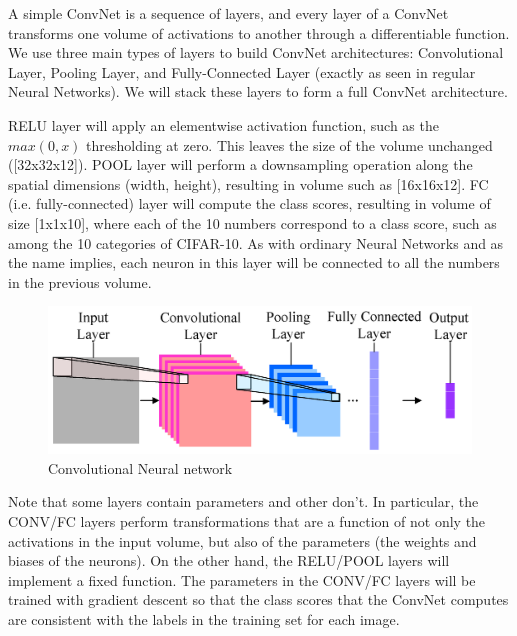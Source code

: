 A simple ConvNet is a sequence of layers, and every layer of a ConvNet transforms one volume of activations to another through a differentiable function. We use three main types of layers to build ConvNet architectures: Convolutional Layer, Pooling Layer, and Fully-Connected Layer (exactly as seen in regular Neural Networks). We will stack these layers to form a full ConvNet architecture.


RELU layer will apply an elementwise activation function, such as the $max(0,x)$ thresholding at zero. This leaves the size of the volume unchanged ([32x32x12]).
POOL layer will perform a downsampling operation along the spatial dimensions (width, height), resulting in volume such as [16x16x12].
FC (i.e. fully-connected) layer will compute the class scores, resulting in volume of size [1x1x10], where each of the 10 numbers correspond to a class score, such as among the 10 categories of CIFAR-10. As with ordinary Neural Networks and as the name implies, each neuron in this layer will be connected to all the numbers in the previous volume.
\begin{figure}[htb!]
    \centering
    \includegraphics[scale=1.25]{chapters/litReview/files/convNet.png}
    \caption{Convolutional Neural network \cite{convNN}}
    \label{Neural network}
    \end{figure}
    \FloatBarrier

Note that some layers contain parameters and other don’t. In particular, the CONV/FC layers perform transformations that are a function of not only the activations in the input volume, but also of the parameters (the weights and biases of the neurons). On the other hand, the RELU/POOL layers will implement a fixed function. The parameters in the CONV/FC layers will be trained with gradient descent so that the class scores that the ConvNet computes are consistent with the labels in the training set for each image.


